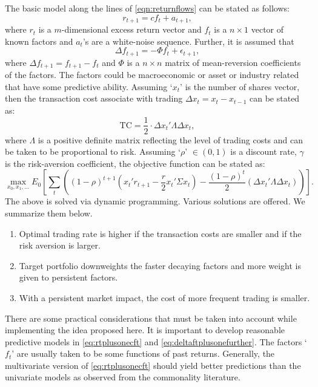 The basic model along the lines of \eqref{eqn:returnflows} can be stated as follows:
	\begin{equation} \label{eq:rtplusonecft}
	r_{t+1}= c f_t + a_{t+1},
	\end{equation}
where $r_t$ is a $m$-dimensional excess return vector and $f_t$ is a $n \times 1$ vector of known factors and $a_t$'s are a white-noise sequence. Further, it is assumed that
	\begin{equation} \label{eq:deltaftplusonefurther}
	\Delta f_{t+1}= -\Phi f_t + \epsilon_{t+1},
	\end{equation}
where $\Delta f_{t+1}= f_{t+1} - f_t$ and $\Phi$ is a $n \times n$ matrix of mean-reversion coefficients of the factors. The factors could be macroeconomic or asset or industry related that have some predictive ability. Assuming `$x_t$' is the number of shares vector, then the transaction cost associate with trading $\Delta x_t= x_t - x_{t-1}$ can be stated as:
	\begin{equation} \label{eq:tceqhalf}
	\text{TC}= \dfrac{1}{2} \cdot \Delta x_t' \Lambda \Delta x_t,
	\end{equation}
where $\Lambda$ is a positive definite matrix reflecting the level of trading costs and can be taken to be proportional to risk. Assuming `$\rho$' $\in (0,1)$ is a discount rate, $\gamma$ is the risk-aversion coefficient, the objective function can be stated as:
	\begin{equation} \label{eq:objectivefunction}
	\max_{x_0,x_1,\ldots} E_0 \left[ \sum_t \left( (1-\rho)^{t+1} \left( x_t' r_{t+1} - \frac{r}{2} x_t' \Sigma x_t \right) - \dfrac{(1-\rho)^t}{2} (\Delta x_t' \Lambda \Delta x_t) \right) \right].
	\end{equation}
The above is solved via dynamic programming. Various solutions are offered. We summarize them below. 

\begin{enumerate}[--]
\item Optimal trading rate is higher if the transaction costs are smaller and if the risk aversion is larger.
\item Target portfolio downweights the faster decaying factors and more weight is given to persistent factors.
\item With a persistent market impact, the cost of more frequent trading is smaller. 
\end{enumerate}


There are some practical considerations that must be taken into account while implementing the idea proposed here. It is important to develop reasonable predictive models in \eqref{eq:rtplusonecft} and \eqref{eq:deltaftplusonefurther}. The factors `$f_t$' are usually taken to be some functions of past returns. Generally, the multivariate version of \eqref{eq:rtplusonecft} should yield better predictions than the univariate models as observed from the commonality literature. 



